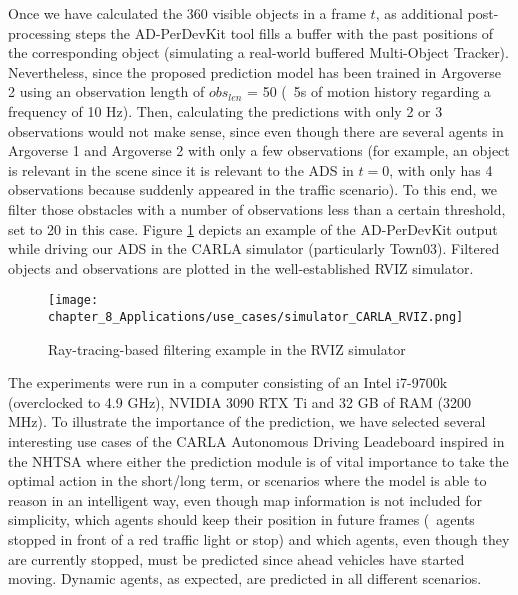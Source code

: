 Once we have calculated the 360 \degree visible objects in a frame $t$, as additional post-processing steps the \ac{AD-PerDevKit} tool fills a buffer with the past positions of the corresponding object (simulating a real-world buffered Multi-Object Tracker). Nevertheless, since the proposed prediction model has been trained in Argoverse 2 using an observation length of \textit{$obs_{len}$} = 50 (\ie \ 5s of motion history regarding a frequency of 10 Hz). Then, calculating the predictions with only 2 or 3 observations would not make sense, since even though there are several agents in Argoverse 1 and Argoverse 2 with only a few observations (for example, an object is relevant in the scene since it is relevant to the \ac{ADS} in $t=0$, with only has 4 observations because suddenly appeared in the traffic scenario). To this end, we filter those obstacles with a number of observations less than a certain threshold, set to 20 in this case. Figure \ref{fig:chapter_8_Applications/use_cases/simulator_CARLA_RVIZ} depicts an example of the \ac{AD-PerDevKit} output while driving our \ac{ADS} in the \ac{CARLA} simulator (particularly Town03). Filtered objects and observations are plotted in the well-established RVIZ simulator. 

\begin{figure}[!h]
	\centering
	\texttt{[image: chapter\_8\_Applications/use\_cases/simulator\_CARLA\_RVIZ.png]}
	\caption{Ray-tracing-based filtering example in the RVIZ simulator}
	\label{fig:chapter_8_Applications/use_cases/simulator_CARLA_RVIZ}
\end{figure}

The experiments were run in a computer consisting of an Intel i7-9700k (overclocked to 4.9 GHz), NVIDIA 3090 RTX Ti and 32 GB of RAM (3200 MHz). To illustrate the importance of the prediction, we have selected several interesting use cases of the CARLA Autonomous Driving Leadeboard inspired in the \ac{NHTSA} where either the prediction module is of vital importance to take the optimal action in the short/long term, or scenarios where the model is able to reason in an intelligent way, even though map information is not included for simplicity, which agents should keep their position in future frames (\eg \ agents stopped in front of a red traffic light or stop) and which agents, even though they are currently stopped, must be predicted since ahead vehicles have started moving. Dynamic agents, as expected, are predicted in all different scenarios. 

